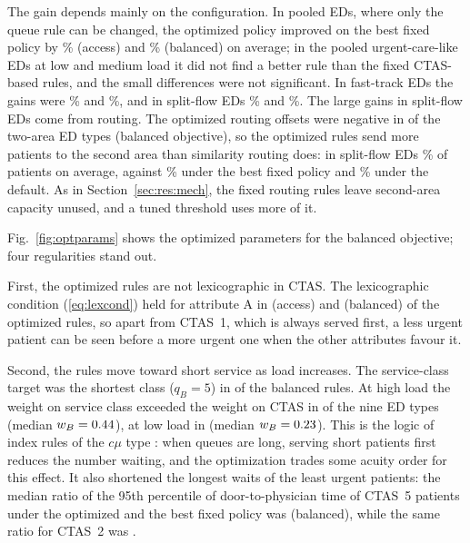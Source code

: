 The gain depends mainly on the configuration. In pooled EDs, where only the queue rule can be changed, the optimized policy improved on the best fixed policy by \OptAccessGainBestPooled\% (access) and \OptBalancedGainBestPooled\% (balanced) on average; in the pooled urgent-care-like EDs at low and medium load it did not find a better rule than the fixed CTAS-based rules, and the small differences were not significant. In fast-track EDs the gains were \OptAccessGainBestFasttrack\% and \OptBalancedGainBestFasttrack\%, and in split-flow EDs \OptAccessGainBestSplitflow\% and \OptBalancedGainBestSplitflow\%. The large gains in split-flow EDs come from routing. The optimized routing offsets were negative in \OptBalancedNOffsetNeg{} of the \OptBalancedNTwoArea{} two-area ED types (balanced objective), so the optimized rules send more patients to the second area than similarity routing does: in split-flow EDs \OptBalancedShareSecondSplitOpt\% of patients on average, against \OptBalancedShareSecondSplitBest\% under the best fixed policy and \OptBalancedShareSecondSplitDefault\% under the default. As in Section~\ref{sec:res:mech}, the fixed routing rules leave second-area capacity unused, and a tuned threshold uses more of it.

Fig.~\ref{fig:optparams} shows the optimized parameters for the balanced objective; four regularities stand out.

First, the optimized rules are not lexicographic in CTAS. The lexicographic condition (\ref{eq:lexcond}) held for attribute A in \OptAccessNLexA{} (access) and \OptBalancedNLexA{} (balanced) of the \NEdTypes{} optimized rules, so apart from CTAS~1, which is always served first, a less urgent patient can be seen before a more urgent one when the other attributes favour it.

Second, the rules move toward short service as load increases. The service-class target was the shortest class ($q_B=5$) in \OptBalancedNqBFive{} of the balanced rules. At high load the weight on service class exceeded the weight on CTAS in \OptBalancedNWbGtWaHigh{} of the nine ED types (median $w_B=0.44$), at low load in \OptBalancedNWbGtWaLow{} (median $w_B=0.23$). This is the logic of index rules of the $c\mu$ type \cite{VanMieghem1995_GenCMu,Mandelbaum2004_GenCMu}: when queues are long, serving short patients first reduces the number waiting, and the optimization trades some acuity order for this effect. It also shortened the longest waits of the least urgent patients: the median ratio of the 95th percentile of door-to-physician time of CTAS~5 patients under the optimized and the best fixed policy was \OptBalancedCtasFiveTailRatio{} (balanced), while the same ratio for CTAS~2 was \OptBalancedCtasTwoTailRatio.


